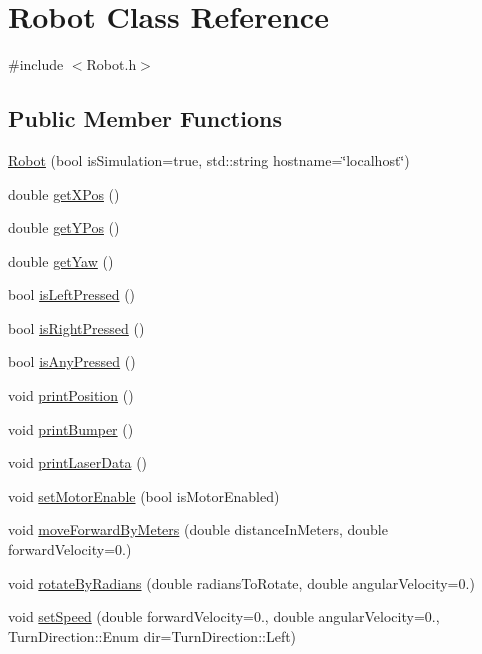 \hypertarget{classRobot}{}\section{Robot Class Reference}
\label{classRobot}


{\ttfamily \#include $<$Robot.\+h$>$}

\subsection*{Public Member Functions}
\begin{DoxyCompactItemize}
\item 
\hyperlink{classRobot_aadf13d050156f275c34eace9e6c3e782}{Robot} (bool is\+Simulation=true, std\+::string hostname=\char`\"{}localhost\char`\"{})
\item 
double \hyperlink{classRobot_a2f6aa9366def08eafe87f1d83d4cf1b7}{get\+X\+Pos} ()
\item 
double \hyperlink{classRobot_a60b83b42a3e08af931709a526632fb6d}{get\+Y\+Pos} ()
\item 
double \hyperlink{classRobot_a30cfb16f262020569b21780eecadf4ae}{get\+Yaw} ()
\item 
bool \hyperlink{classRobot_a3b33d92fbb96a9dc1c1eb7e2b776be38}{is\+Left\+Pressed} ()
\item 
bool \hyperlink{classRobot_acb4caaf0af89fd69fcc0396e79690a39}{is\+Right\+Pressed} ()
\item 
bool \hyperlink{classRobot_a71db47948a4fc61791ffa789033bfac4}{is\+Any\+Pressed} ()
\item 
void \hyperlink{classRobot_a64aeca7dab240ea7d56adf4de8448cba}{print\+Position} ()
\item 
void \hyperlink{classRobot_a04301aeae6bb441235a9020f2b214fbf}{print\+Bumper} ()
\item 
void \hyperlink{classRobot_a4117efa8d1191d33b76851e5b5b1b13d}{print\+Laser\+Data} ()
\item 
void \hyperlink{classRobot_ae59cdda4345c38cff6157f78a417b102}{set\+Motor\+Enable} (bool is\+Motor\+Enabled)
\item 
void \hyperlink{classRobot_a8cb45b5d6e8ede01ebe6996d7edcd093}{move\+Forward\+By\+Meters} (double distance\+In\+Meters, double forward\+Velocity=0.)
\item 
void \hyperlink{classRobot_a4e139756e0d56b718ff5c19daa7c5f57}{rotate\+By\+Radians} (double radians\+To\+Rotate, double angular\+Velocity=0.)
\item 
void \hyperlink{classRobot_a1135ca4f689f1d8354cb03c3a095934e}{set\+Speed} (double forward\+Velocity=0., double angular\+Velocity=0., Turn\+Direction\+::\+Enum dir=Turn\+Direction\+::\+Left)

\end{DoxyCompactItemize}
